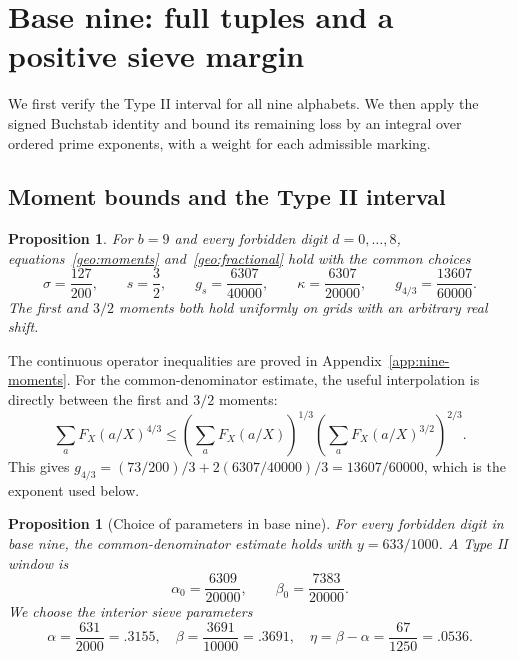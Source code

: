 \documentclass[11pt,a4paper]{article}
\theoremstyle{paperplain}
\newtheorem{proposition}[theorem]{Proposition}
\numberwithin{equation}{section}
\begin{document}
\section{Base nine: full tuples and a positive sieve margin}\label{nine:sieve-section}

We first verify the Type II interval for all nine alphabets. We then
apply the signed Buchstab identity and bound its remaining loss by an
integral over ordered prime exponents, with a weight for each admissible
marking.

\subsection{Moment bounds and the Type II interval}\label{nine:fourier-section}

\begin{proposition}\label{nine:fourier}
For $b=9$ and every forbidden digit $d=0,\ldots,8$,
equations~\eqref{geo:moments} and~\eqref{geo:fractional} hold with the common choices
\begin{equation}\label{nine:moment-values}
 \sigma=\frac{127}{200},\qquad s=\frac32,\qquad
 g_s=\frac{6307}{40000},\qquad
 \kappa=\frac{6307}{20000},\qquad
 g_{4/3}=\frac{13607}{60000}.
\end{equation}
The first and $3/2$ moments both hold uniformly on grids with an arbitrary real shift.
\end{proposition}

The continuous operator inequalities are proved in
Appendix~\ref{app:nine-moments}. For the common-denominator estimate, the
useful interpolation is directly between the first and $3/2$ moments:
\[
 \sum_a F_X(a/X)^{4/3}
 \le\left(\sum_a F_X(a/X)\right)^{1/3}
      \left(\sum_a F_X(a/X)^{3/2}\right)^{2/3}.
\]
This gives $g_{4/3}=(73/200)/3+2(6307/40000)/3=13607/60000$,
which is the exponent used below.

\begin{proposition}[Choice of parameters in base nine]\label{nine:parameters}
For every forbidden digit in base nine, the common-denominator estimate holds
with $y=633/1000$. A Type II window is
\begin{equation}\label{nine:buffer}
 \alpha_0=\frac{6309}{20000},\qquad
 \beta_0=\frac{7383}{20000}.
\end{equation}
We choose the interior sieve parameters
\begin{equation}\label{nine:sieve-params}
 \alpha=\frac{631}{2000}=.3155,\quad
 \beta=\frac{3691}{10000}=.3691,\quad
 \eta=\beta-\alpha=\frac{67}{1250}=.0536.
\end{equation}
\end{proposition}
\end{document}

